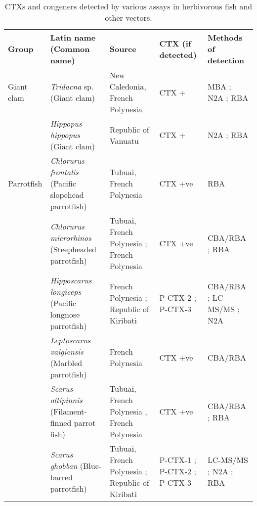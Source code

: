 \documentclass[12pt]{article}
\begin{document}
\begin{longtable}{ | p{2cm} | p{3cm} | p{4.5cm} | p{2cm} | p{3cm} | }
	\caption{CTXs and congeners detected by various assays in herbivorous fish and other vectors.}\\
	\label{tbl:HerbTable}
	\textbf{Group} & \textbf{Latin name} (Common name) & \textbf{Source} & \textbf{CTX (if detected)} & \textbf{Methods of detection} \\
	\hline
	Giant clam & \emph{Tridacna} sp. (Giant clam) & New Caledonia, French Polynesia \cite{laurent2012ciguatera} & CTX +\cite{laurent2012ciguatera} & MBA \cite{laurent2012ciguatera}; N2A \cite{laurent2012ciguatera}; RBA \cite{laurent2012ciguatera} \\
	& \emph{Hippopus hippopus} (Giant clam) & Republic of Vanuatu \cite{laurent2012ciguatera} & CTX +\cite{laurent2012ciguatera} & N2A \cite{laurent2012ciguatera}; RBA \cite{laurent2012ciguatera} \\
	\hline
	Parrotfish & \emph{Chlorurus frontalis} (Pacific slopehead parrotfish) & Tubuai, French Polynesia \cite{darius2007ciguatera} & CTX +ve \cite{darius2007ciguatera} & RBA \cite{darius2007ciguatera} \\
	& \emph{Chlorurus microrhinos} (Steepheaded parrotfish) & Tubuai, French Polynesia \cite{darius2007ciguatera}; French Polynesia \cite{chinain2014mail} & CTX +ve \cite{darius2007ciguatera,chinain2014mail} & CBA/RBA \cite{chinain2014mail}; RBA \cite{darius2007ciguatera} \\
	& \emph{Hipposcarus longiceps} (Pacific longnose parrotfish) & French Polynesia \cite{chinain2014mail}; Republic of Kiribati \cite{mak2013pacific} & P-CTX-2 \cite{mak2013pacific}; P-CTX-3 \cite{mak2013pacific} & CBA/RBA \cite{chinain2014mail}; LC-MS/MS \cite{mak2013pacific}; N2A \cite{mak2013pacific} \\
	& \emph{Leptoscarus vaigiensis} (Marbled parrotfish) & French Polynesia \cite{chinain2014mail} & CTX +ve \cite{chinain2014mail} & CBA/RBA \cite{chinain2014mail} \\
	& \emph{Scarus altipinnis} (Filament-finned parrot fish) & Tubuai, French Polynesia \cite{darius2007ciguatera}, French Polynesia \cite{chinain2014mail} & CTX +ve \cite{darius2007ciguatera,chinain2014mail} & CBA/RBA \cite{chinain2014mail}; RBA \cite{darius2007ciguatera} \\
	& \emph{Scarus ghobban} (Blue-barred parrotfish) & Tubuai, French Polynesia \cite{darius2007ciguatera}; Republic of Kiribati \cite{mak2013pacific} & P-CTX-1 \cite{mak2013pacific}; P-CTX-2 \cite{mak2013pacific}; P-CTX-3 \cite{mak2013pacific} & LC-MS/MS \cite{mak2013pacific}; N2A \cite{mak2013pacific}; RBA \cite{darius2007ciguatera} \\

\end{longtable}
\end{document}
